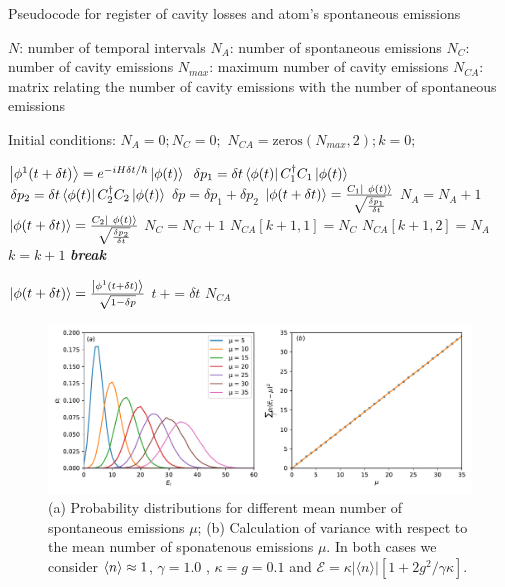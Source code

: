 \documentclass[conference]{IEEEtran}
\begin{document}
\begin{algorithm}[!t]
\caption{Pseudocode for register of cavity losses and atom's spontaneous emissions}
\label{alg1}
\begin{algorithmic}
\STATE $N$: number of temporal intervals
\STATE $N_A $: number of spontaneous emissions
\STATE $N_C$: number of cavity emissions
\STATE $N_{max}$: maximum number of cavity emissions
\STATE $N_{CA}$: matrix relating the number of cavity emissions with the number of spontaneous emissions

\STATE
\STATE Initial conditions:
\STATE $N_A = 0; N_C = 0;$
\STATE $N_{CA} = \text{zeros}(N_{max},2);  k = 0;$ 

\STATE 

\STATE $\ket{ \phi^1(t + \delta t)} = e^{-iH\delta t/\hbar}\ket{\phi (t)}$
\STATE$ \delta p_1 = \delta t\bra{\phi(t)}C^\dagger_1 C_1\ket{\phi(t)}$
\STATE $ \delta p_2 =  \delta t\bra{\phi(t)}C^\dagger_2 C_2\ket{\phi(t)}$
\STATE $\delta p = \delta p_1 + \delta p_2$
\STATE $\ket{\phi (t + \delta t)} = \frac{C_1 \ket{ \ \phi(t)}}{\sqrt \frac{\delta p_1}{\delta t}}$
\STATE $N_A = N_A + 1$
\ELSE
\STATE $\ket{\phi (t + \delta t)} = \frac{C_2 \ket{ \ \phi(t)}}{\sqrt \frac{\delta p_2}{\delta t}}$
\STATE $N_C = N_C + 1$
\STATE $N_{CA}[k+1,1] = N_C$
\STATE  $N_{CA}[k+1,2] = N_A$
\STATE $k = k+1$
\STATE \textbf{\textit{break}}
\ENDIF

\ENDIF
\ELSE
\STATE $\ket{ \phi(t + \delta t)} = \frac{\ket{\phi^1 (t+ \delta t)}}{\sqrt{1-\delta p}}$
\STATE $t \ += \delta t$
\ENDIF
\ENDFOR
\RETURN  $N_{CA}$

\end{algorithmic}

\end{algorithm}



\begin{center}
\begin{figure}[!t]\label{error2}
\begin{center}
\includegraphics[scale = 0.55]{newerrorppp.pdf}
\caption{\small{(a) Probability distributions for different mean number of spontaneous emissions $\mu$; (b) Calculation of variance with respect to the mean number of sponatenous emissions $\mu$. In both cases we consider $\expval{n} \approx 1$, $\gamma = 1.0$ , $\kappa = g = 0.1$ and $\mathcal{E} =  \kappa |\langle n \rangle|[1 + 2g^2/\gamma \kappa]$.}} \label{probdisult}
\end{center}
\end{figure}
\end{center}
\end{document}
